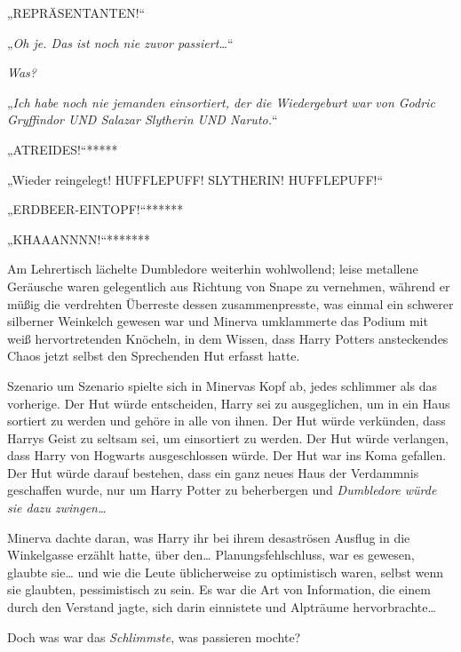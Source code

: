 {\later

„REPRÄSENTANTEN!“

\later

„\emph{Oh je. Das ist noch nie zuvor passiert…}“

\emph{Was?}

„\emph{Ich habe noch nie jemanden einsortiert, der die Wiedergeburt} \emph{war} \emph{von Godric Gryffindor UND Salazar Slytherin UND Naruto.}“

\later

„ATREIDES!“*****

\later

„Wieder reingelegt! HUFFLEPUFF! SLYTHERIN! HUFFLEPUFF!“

\later

„ERDBEER-EINTOPF!“******

\later

„KHAAANNNN!“*******

\later

Am Lehrertisch lächelte Dumbledore weiterhin wohlwollend; leise metallene Geräusche waren gelegentlich aus Richtung von Snape zu vernehmen, während er müßig die verdrehten Überreste dessen zusammenpresste, was einmal ein schwerer silberner Weinkelch gewesen war und Minerva umklammerte das Podium mit weiß hervortretenden Knöcheln, in dem Wissen, dass Harry Potters ansteckendes Chaos jetzt selbst den Sprechenden Hut erfasst hatte.

Szenario um Szenario spielte sich in Minervas Kopf ab, jedes schlimmer als das vorherige. Der Hut würde entscheiden, Harry sei zu ausgeglichen, um in ein Haus sortiert zu werden und gehöre in alle von ihnen. Der Hut würde verkünden, dass Harrys Geist zu seltsam sei, um einsortiert zu werden. Der Hut würde verlangen, dass Harry von Hogwarts ausgeschlossen würde. Der Hut war ins Koma gefallen. Der Hut würde darauf bestehen, dass ein ganz neues Haus der Verdammnis geschaffen wurde, nur um Harry Potter zu beherbergen und \emph{Dumbledore würde sie dazu zwingen…}

Minerva dachte daran, was Harry ihr bei ihrem desaströsen Ausflug in die Winkelgasse erzählt hatte, über den… Planungsfehlschluss, war es gewesen, glaubte sie… und wie die Leute üblicherweise zu optimistisch waren, selbst wenn sie glaubten, pessimistisch zu sein. Es war die Art von Information, die einem durch den Verstand jagte, sich darin einnistete und Alpträume hervorbrachte…

Doch was war das \emph{Schlimmste}, was passieren mochte?

}
